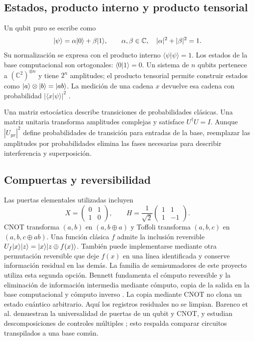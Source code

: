 \subsection{Estados, producto interno y producto tensorial}
Un qubit puro se escribe como
\begin{equation}
\lvert \psi\rangle=\alpha\lvert 0\rangle+\beta\lvert 1\rangle,\qquad
\alpha,\beta\in\mathbb{C},\quad |\alpha|^2+|\beta|^2=1.
\end{equation}
Su normalización se expresa con el producto interno
$\langle\psi|\psi\rangle=1$. Los estados de la base computacional son
ortogonales: $\langle0|1\rangle=0$. Un sistema de $n$ qubits pertenece a
$(\mathbb{C}^2)^{\otimes n}$ y tiene $2^n$ amplitudes; el producto tensorial
permite construir estados como $\lvert a\rangle\otimes\lvert b\rangle=\lvert ab\rangle$.
La medición de una cadena $x$ devuelve esa cadena con probabilidad
$|\langle x|\psi\rangle|^2$ \cite{nielsen2010}.

Una matriz estocástica describe transiciones de probabilidades clásicas. Una
matriz unitaria transforma amplitudes complejas y satisface $U^\dagger U=I$.
Aunque $|U_{yx}|^2$ define probabilidades de transición para entradas de la base,
reemplazar las amplitudes por probabilidades elimina las fases necesarias para
describir interferencia y superposición.

\subsection{Compuertas y reversibilidad}
Las puertas elementales utilizadas incluyen
\begin{equation}
X=\begin{pmatrix}0&1\\1&0\end{pmatrix},\qquad
H=\frac{1}{\sqrt2}\begin{pmatrix}1&1\\1&-1\end{pmatrix}.
\end{equation}
CNOT transforma $(a,b)$ en $(a,b\oplus a)$ y Toffoli transforma
$(a,b,c)$ en $(a,b,c\oplus ab)$. Una función clásica $f$ admite la inclusión
reversible $U_f\lvert x\rangle\lvert z\rangle=\lvert x\rangle\lvert z\oplus f(x)\rangle$.
También puede implementarse mediante otra permutación reversible que deje
$f(x)$ en una línea identificada y conserve información residual en las demás.
La familia de semisumadores de este proyecto utiliza esta segunda opción.
Bennett fundamenta el cómputo reversible y la eliminación de información
intermedia mediante cómputo, copia de la salida en la base computacional y
cómputo inverso \cite{bennett1973}. La copia mediante CNOT no clona un estado
cuántico arbitrario. Aquí los registros residuales no se limpian.
Barenco et al. demuestran la universalidad de puertas de un qubit y CNOT,
y estudian descomposiciones de controles múltiples \cite{barenco1995}; esto
respalda comparar circuitos transpilados a una base común.

